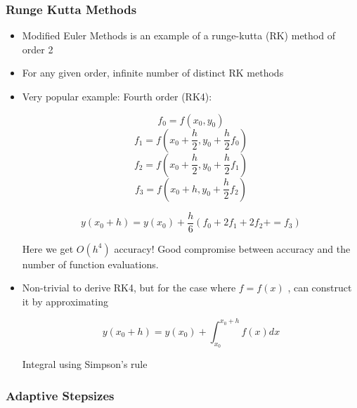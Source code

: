 \subsubsection{Runge Kutta Methods}

\begin{itemize}
    \item Modified Euler Methods is an example of a runge-kutta (RK) method of order 2
    \item For any given order, infinite number of distinct RK methods
    \item Very popular example: Fourth order (RK4):

    \[ f_0 = f(x_0, y_0)\]
    \[ f_1 = f(x_0+\frac{h}{2}, y_0+\frac{h}{2}f_0)\]
    \[ f_2 = f(x_0+\frac{h}{2}, y_0+\frac{h}{2}f_1)\]
    \[ f_3 = f(x_0+h, y_0+\frac{h}{2}f_2)\]

    \[y(x_0+h) = y(x_0)+ \frac{h}{6} (f_0 + 2 f_1 + 2 f_2 += f_3)\]

    Here we get $O(h^4)$ accuracy! Good compromise between accuracy and the number of function evaluations.

    \item Non-trivial to derive RK4, but for the case where $f=f(x)$ , can construct it by approximating 

    \[ y(x_0+h) = y(x_0) + \int_{x_0}^{x_0+h} f(x) dx\]

    Integral using Simpson's rule
\end{itemize}

\subsubsection{Adaptive Stepsizes}

